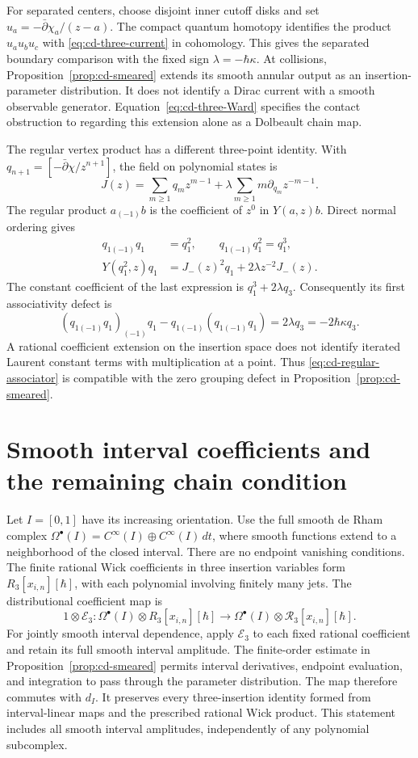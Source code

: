 For separated centers, choose disjoint inner cutoff disks and set
$u_a=-\bar\partial\chi_a/(z-a)$.
The compact quantum homotopy identifies the product $u_au_bu_c$ with
\eqref{eq:cd-three-current} in cohomology.
This gives the separated boundary comparison with the fixed sign
$\lambda=-\hbar\kappa$.
At collisions, Proposition~\ref{prop:cd-smeared} extends its smooth annular
output as an insertion-parameter distribution.  It does not identify a
Dirac current with a smooth observable generator.
Equation~\eqref{eq:cd-three-Ward} specifies the contact obstruction to
regarding this extension alone as a Dolbeault chain map.

The regular vertex product has a different three-point identity.
With $q_{n+1}=[-\bar\partial\chi/z^{n+1}]$, the field on polynomial states is
\[
 J(z)=\sum_{m\ge1}q_mz^{m-1}
       +\lambda\sum_{m\ge1}m\partial_{q_m}z^{-m-1}.
\]
The regular product $a_{(-1)}b$ is the coefficient of $z^0$ in $Y(a,z)b$.
Direct normal ordering gives
\[
 \begin{split}
 q_{1(-1)}q_1&=q_1^2,\qquad q_{1(-1)}q_1^2=q_1^3,\\
 Y(q_1^2,z)q_1&=J_-(z)^2q_1+2\lambda z^{-2}J_-(z).
 \end{split}
\]
The constant coefficient of the last expression is $q_1^3+2\lambda q_3$.
Consequently its first associativity defect is
\begin{equation}
 \label{eq:cd-regular-associator}
 (q_{1(-1)}q_1)_{(-1)}q_1-q_{1(-1)}(q_{1(-1)}q_1)
 =2\lambda q_3=-2\hbar\kappa q_3.
\end{equation}
A rational coefficient extension on the insertion space does not identify
iterated Laurent constant terms with multiplication at a point.
Thus \eqref{eq:cd-regular-associator} is compatible with the zero grouping
defect in Proposition~\ref{prop:cd-smeared}.

\section{Smooth interval coefficients and the remaining chain condition}

Let $I=[0,1]$ have its increasing orientation.
Use the full smooth de Rham complex
$\Omega^\bullet(I)=C^\infty(I)\oplus C^\infty(I)\,dt$,
where smooth functions extend to a neighborhood of the closed interval.
There are no endpoint vanishing conditions.
The finite rational Wick coefficients in three insertion variables form
$R_3[x_{i,n}][\hbar]$, with each polynomial involving finitely many jets.
The distributional coefficient map is
\[
 1\otimes\mathcal E_3:
 \Omega^\bullet(I)\otimes R_3[x_{i,n}][\hbar]
 \longrightarrow
 \Omega^\bullet(I)\otimes\mathscr R_3[x_{i,n}][\hbar].
\]
For jointly smooth interval dependence, apply $\mathcal E_3$ to each
fixed rational coefficient and retain its full smooth interval amplitude.
The finite-order estimate in Proposition~\ref{prop:cd-smeared} permits
interval derivatives, endpoint evaluation, and integration to pass through
the parameter distribution.  The map therefore commutes with $d_I$.
It preserves every three-insertion identity formed from interval-linear
maps and the prescribed rational Wick product.
This statement includes all smooth interval amplitudes, independently
of any polynomial subcomplex.

